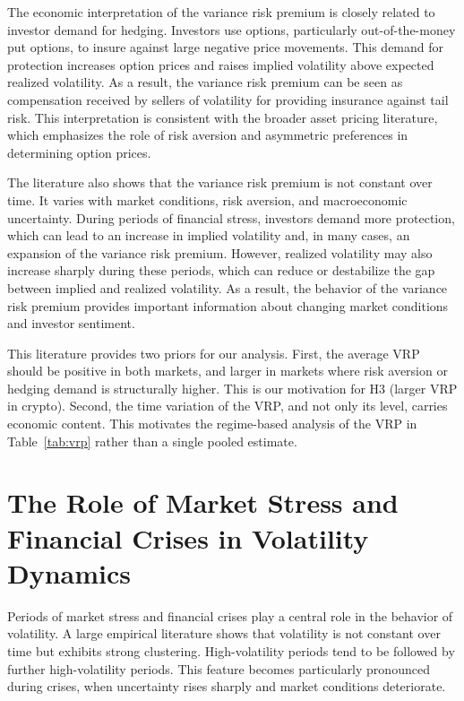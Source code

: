 \documentclass[11pt,a4paper,openany]{report}
\begin{document}
The economic interpretation of the variance risk premium is closely
related to investor demand for hedging. Investors use options,
particularly out-of-the-money put options, to insure against large
negative price movements. This demand for protection increases option
prices and raises implied volatility above expected realized volatility.
As a result, the variance risk premium can be seen as compensation
received by sellers of volatility for providing insurance against tail
risk. This interpretation is consistent with the broader asset pricing
literature, which emphasizes the role of risk aversion and asymmetric
preferences in determining option prices.

The literature also shows that the variance risk premium is not constant
over time. It varies with market conditions, risk aversion, and
macroeconomic uncertainty. During periods of financial stress, investors
demand more protection, which can lead to an increase in implied
volatility and, in many cases, an expansion of the variance risk
premium. However, realized volatility may also increase sharply during
these periods, which can reduce or destabilize the gap between implied
and realized volatility. As a result, the behavior of the variance risk
premium provides important information about changing market conditions
and investor sentiment.

This literature provides two priors for our analysis. First, the
average VRP should be positive in both markets, and larger in markets
where risk aversion or hedging demand is structurally higher. This is
our motivation for H3 (larger VRP in crypto). Second, the time
variation of the VRP, and not only its level, carries economic
content. This motivates the regime-based analysis of the VRP in
Table~\ref{tab:vrp} rather than a single pooled estimate.

\section{The Role of Market Stress and Financial Crises in Volatility
Dynamics}\label{the-role-of-market-stress-and-financial-crises-in-volatility-dynamics}

Periods of market stress and financial crises play a central role in the
behavior of volatility. A large empirical literature shows that
volatility is not constant over time but exhibits strong clustering.
High-volatility periods tend to be followed by further high-volatility
periods. This feature becomes particularly pronounced during crises,
when uncertainty rises sharply and market conditions deteriorate.
\end{document}
